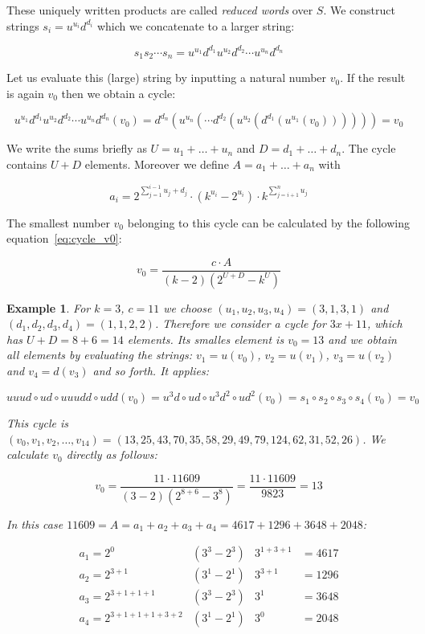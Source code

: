 \documentclass[12pt]{amsart}
\newtheorem{example}[theorem]{Example}
\theoremstyle{definition}
\begin{document}
These uniquely written products are called \textit{reduced words} over $S$. We construct strings $s_i=u^{u_i}d^{d_i}$ which we concatenate to a larger string:

\[
s_1s_2\cdots s_n=u^{u_1}d^{d_1}u^{u_2}d^{d_2}\cdots u^{u_n}d^{d_n}
\]

Let us evaluate this (large) string by inputting a natural number $v_0$. If the result is again $v_0$ then we obtain a cycle:

\[
u^{u_1}d^{d_1}u^{u_2}d^{d_2}\cdots u^{u_n}d^{d_n}(v_0)=d^{d_n}(u^{u_n}(\cdots d^{d_2}(u^{u_2}(d^{d_1}(u^{u_1}(v_0))))))=v_0
\]

We write the sums briefly as $U=u_1+\ldots+u_n$ and $D=d_1+\ldots+d_n$. The cycle contains $U+D$ elements. Moreover we define $A=a_1+\ldots+a_n$ with

\[
a_i=2^{\sum_{j=1}^{i-1}u_j+d_j}\cdot\left(k^{u_i}-2^{u_i}\right)\cdot k^{\sum_{j=i+1}^{n}u_j}
\]

The smallest number $v_0$ belonging to this cycle can be calculated by the following equation~\ref{eq:cycle_v0}:

\begin{equation}
\label{eq:cycle_v0}
v_0=\frac{c\cdot A}{(k-2)(2^{U+D}-k^U)}
\end{equation}

\begin{example}
For $k=3$, $c=11$ we choose $(u_1,u_2,u_3,u_4)=(3,1,3,1)$ and $(d_1,d_2,d_3,d_4)=(1,1,2,2)$. Therefore we consider a cycle for $3x+11$, which has $U+D=8+6=14$ elements. Its smalles element is $v_0=13$ and we obtain all elements by evaluating the strings: $v_1=u(v_0)$, $v_2=u(v_1)$, $v_3=u(v_2)$ and $v_4=d(v_3)$ and so forth. It applies:

\[
uuud\circ ud\circ uuudd\circ udd(v_0)=u^3d\circ ud\circ u^3d^2\circ ud^2(v_0)=s_1\circ s_2\circ s_3\circ s_4(v_0)=v_0
\]

\par\medskip\noindent
This cycle is $(v_0,v_1,v_2,\ldots,v_{14})=(13,25,43,70,35,58,29,49,79,124,62,31,52,26)$. We calculate $v_0$ directly as follows:

\[
v_0=\frac{11\cdot 11609}{(3-2)(2^{8+6}-3^8)}=\frac{11\cdot11609}{9823}=13
\]

\par\noindent
In this case $11609=A=a_1+a_2+a_3+a_4=4617+1296+3648+2048$:

\[
\begin{array}{llll}
a_1=2^{0}&(3^3-2^3)&3^{1+3+1}&=4617\\
a_2=2^{3+1}&(3^1-2^1)&3^{3+1}&=1296\\
a_3=2^{3+1+1+1}&(3^3-2^3)&3^{1}&=3648\\
a_4=2^{3+1+1+1+3+2}&(3^1-2^1)&3^{0}&=2048
\end{array}
\]
\end{example}
\end{document}
